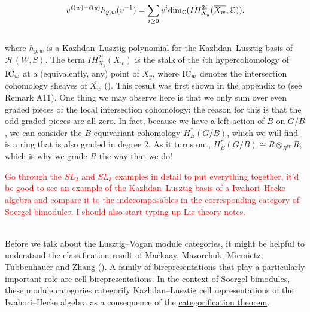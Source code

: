 \begin{remark}
\begin{align*}
\begin{split}
v^{\ell(w) - \ell(y)} h_{y,w}(v^{-1}) = \sum_{i \geq 0} v^i \textup{dim}_\mathbb{C}(IH^{2i}_{X_y}(\overline{X_w}, \mathbb{C})),
\end{split}
\end{align*}
\noindent\\[-0.7\linespacing] where $h_{y,w}$ is a Kazhdan--Lusztig polynomial for the Kazhdan--Lusztig basis of $\mathscr{H}(W, S)$. The term $IH^{2i}_{X_y}(X_w)$ is the stalk of the $i$th hypercohomology of $\textup{IC}_w$ at a (equivalently, any) point of $X_y$, where $\textup{IC}_w$ denotes the intersection cohomology sheaves of $\overline{X_w}$ (\cite[Theorem 13.13]{EMTW20}). This result was first shown in the appendix to \cite{KL79} (see Remark A11). One thing we may observe here is that we only sum over even graded pieces of the local intersection cohomology; the reason for this is that the odd graded pieces are all zero. In fact, because we have a left action of $B$ on $G/B$, we can consider the $B$-equivariant cohomology $H_B^*(G/B)$, which we will find is a ring that is also graded in degree $2$. As it turns out, $H_B^*(G/B) \cong R \otimes_{R^W} R$, which is why we grade $R$ the way that we do!\newpage
\end{remark}

\noindent\textcolor{red}{Go through the $SL_2$ and $SL_3$ examples in detail to put everything together, it'd be good to see an example of the Kazhdan--Lusztig basis of a Iwahori--Hecke algebra and compare it to the indecomposables in the corresponding category of Soergel bimodules. I should also start typing up Lie theory notes.}\\
\newpage

\noindent 

\newpage

\noindent\\ Before we talk about the Lusztig--Vogan module categories, it might be helpful to understand the classification result of Mackaay, Mazorchuk, Miemietz, Tubbenhauer and Zhang (\cite{MMMTZ23}). A family of birepresentations that play a particularly important role are cell birepresentations. In the context of Soergel bimodules, these module categories categorify Kazhdan--Lusztig cell representations of the Iwahori--Hecke algebra as a consequence of the \hyperref[SoergelConjecture]{categorification theorem}.\\

